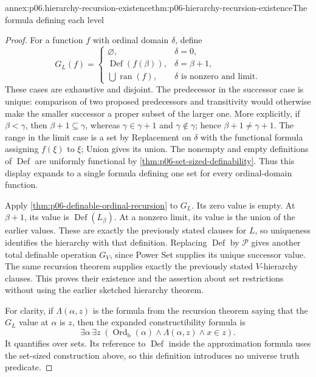 \begin{annexitem}{annex:p06.hierarchy-recursion-existence}{thm:p06-hierarchy-recursion-existence}{The formula defining each level}
\begin{proof}
For a function \(f\) with ordinal domain \(\delta\), define
\[
 G_L(f)=
 \begin{cases}
  \varnothing,&\delta=0,\\
  \operatorname{Def}(f(\beta)),&\delta=\beta+1,\\
  \bigcup\operatorname{ran}(f),&\delta\text{ is nonzero and limit}.
 \end{cases}
\]
These cases are exhaustive and disjoint.  The predecessor in the
successor case is unique: comparison of two proposed predecessors
and transitivity would otherwise make the smaller successor a
proper subset of the larger one.  More explicitly, if
\(\beta<\gamma\), then \(\beta+1\subseteq\gamma\), whereas
\(\gamma\in\gamma+1\) and \(\gamma\notin\gamma\); hence
\(\beta+1\ne\gamma+1\).
The range in the limit case is a set by Replacement on
\(\delta\) with the functional formula assigning \(f(\xi)\)
to \(\xi\); Union gives its union.
The nonempty and empty definitions of \(\operatorname{Def}\)
are uniformly functional by \cref{thm:p06-set-sized-definability}.
Thus this display expands to a single formula defining one set
for every ordinal-domain function.

Apply \cref{thm:p06-definable-ordinal-recursion} to \(G_L\).
Its zero value is empty.  At \(\beta+1\), its value is
\(\operatorname{Def}(L_\beta)\).  At a nonzero limit, its value
is the union of the earlier values.  These are exactly the
previously stated clauses for \(L\), so uniqueness identifies
the hierarchy with that definition.
Replacing \(\operatorname{Def}\) by \(\mathcal{P}\) gives another
total definable operation \(G_V\), since Power Set supplies its
unique successor value.  The same recursion theorem supplies
exactly the previously stated \(V\)-hierarchy clauses.
This proves their existence and the assertion about set
restrictions without using the earlier sketched hierarchy theorem.

For clarity, if \(\Lambda(\alpha,z)\) is the formula from the
recursion theorem saying that the \(G_L\) value at \(\alpha\)
is \(z\), then the expanded constructibility formula is
\[
 \exists\alpha\,\exists z\;
    (\operatorname{Ord}_{\mathrm b}(\alpha)
                   \land\Lambda(\alpha,z)\land x\in z).
\]
It quantifies over sets.  Its reference to \(\operatorname{Def}\)
inside the approximation formula uses the set-sized construction
above, so this definition introduces no universe truth predicate.
\end{proof}
\end{annexitem}

